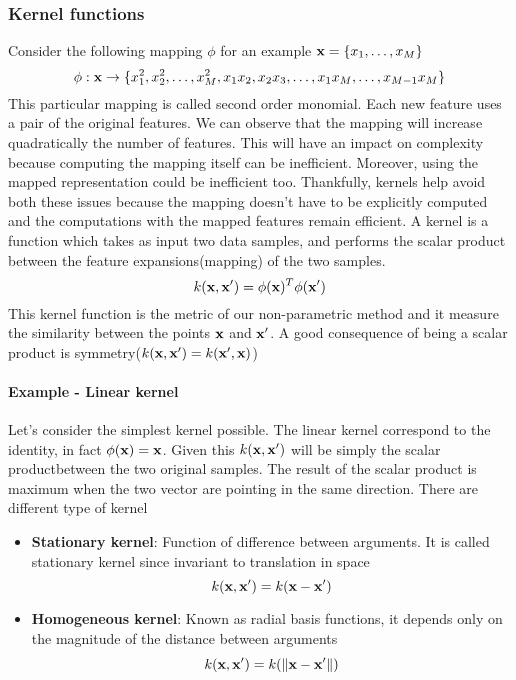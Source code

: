 \documentclass[main.tex]{subfiles}
\begin{document}
\subsubsection{Kernel functions}
Consider the following mapping $\phi$ for an example $\textbf{x}=\{x_1, \dots, x_M\}$
\begin{equation*}
    \phi:\textbf{x} \rightarrow \{x_1^2,x_2^2,\dots,x_M^2,x_1x_2,x_2x_3, \dots,x_1x_M, \dots, x_{M-1}x_M\}
\end{equation*}
This particular mapping is called second order monomial. Each new feature uses a pair of the original features. We can observe that the mapping will increase quadratically the number of features. This will have an impact on complexity because computing the mapping itself can be inefficient. Moreover, using the mapped representation could be inefficient too.
Thankfully, kernels help avoid both these issues because the mapping doesn't have to be explicitly computed and the computations with the mapped features remain efficient.
A kernel is a function which takes as input two data samples, and performs the scalar product between the feature expansions(mapping) of the two samples.
\begin{equation}
    k(\textbf{x},\textbf{x}') = \phi(\textbf{x})^T \phi(\textbf{x}')
\end{equation}
This kernel function is the metric of our non-parametric method and it measure the similarity between the points $\textbf{x}$ and $\textbf{x}'$. A good consequence of being a scalar product is symmetry($k(\textbf{x},\textbf{x}') = k(\textbf{x}',\textbf{x})$)
\paragraph{Example - Linear kernel} Let's consider the simplest kernel possible. The linear kernel correspond to the identity, in fact $\phi(\textbf{x}) = \textbf{x}$. Given this $k(\textbf{x},\textbf{x}')$ will be simply the scalar product\footnotemark between the two original samples. The result of the scalar product is maximum when the two vector are pointing in the same direction. 
\newline
There are different type of kernel
\begin{itemize}
    \item \textbf{Stationary kernel}: Function of difference between arguments. It is called stationary kernel since invariant to translation in space
    \begin{equation*}
        k(\textbf{x},\textbf{x}') = k(\textbf{x}-\textbf{x}')
    \end{equation*}
    \item \textbf{Homogeneous kernel}: Known as radial basis functions, it depends only on the magnitude of the distance between arguments
    \begin{equation*}
        k(\textbf{x},\textbf{x}') = k(\|\textbf{x}-\textbf{x}'\|)
    \end{equation*}
\end{itemize}
\end{document}
